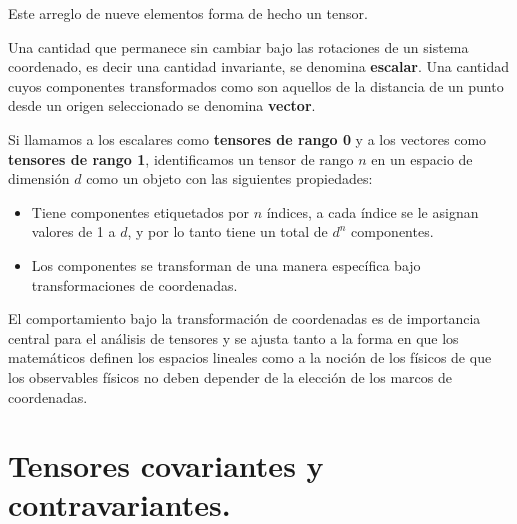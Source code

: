 \documentclass[14pt]{extarticle}
\numberwithin{equation}{section}
\begin{document}
Este arreglo de nueve elementos forma de hecho un tensor.
\par
Una cantidad que permanece sin cambiar bajo las rotaciones de un sistema coordenado, es decir una cantidad invariante, se denomina \textbf{escalar}. Una cantidad cuyos componentes transformados como son aquellos de la distancia de un punto desde un origen seleccionado se denomina \textbf{vector}. 
\par
Si llamamos a los escalares como \textbf{tensores de rango 0} y a los vectores como \textbf{tensores de rango 1}, identificamos un tensor de rango $n$ en un espacio de dimensión $d$ como un objeto con las siguientes propiedades:
\begin{itemize}
\item Tiene componentes etiquetados por $n$ índices, a cada índice se le asignan valores de 1 a $d$, y por lo tanto tiene un total de $d^{n}$ componentes.
\item Los componentes se transforman de una manera específica bajo transformaciones de coordenadas.
\end{itemize}
El comportamiento bajo la transformación de coordenadas es de importancia central para el análisis de tensores y se ajusta tanto a la forma en que los matemáticos definen los espacios lineales como a la noción de los físicos de que los observables físicos no deben depender de la elección de los marcos de coordenadas.

\section{Tensores covariantes y contravariantes.}
\end{document}
